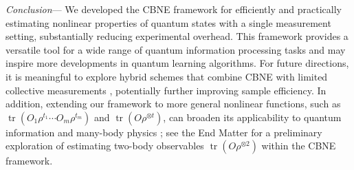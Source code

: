 \documentclass[aps,prl,twocolumn,nofootinbib,superscriptaddress,10pt]{revtex4-2}
\def\>{\rangle}
\DeclareMathOperator{\Tr}{tr}
\theoremstyle{plain}
\theoremstyle{definition}
\begin{document}
\emph{Conclusion}---
We developed the CBNE framework for efficiently and practically estimating nonlinear properties of quantum states with a single measurement setting, substantially reducing experimental overhead. 
This framework provides a versatile tool for a wide range of quantum information processing tasks and may inspire more  developments in quantum learning algorithms. 
For future directions, it is meaningful to explore hybrid schemes that combine CBNE with limited collective measurements \cite{PRXQuantum.6.010336,chen2024optimal}, potentially further improving sample efficiency. 
In addition, extending our framework to more general nonlinear functions, such as $\Tr(O_1\rho^{t_1}\cdots O_m\rho^{t_m})$ and $\Tr(O\rho^{\otimes t})$, can broaden its applicability to quantum information and many-body physics \cite{PRXQuantum.5.030338,PhysRevLett.127.260501,zhou2024hybrid}; see the End Matter for a preliminary exploration of estimating two-body observables $\Tr(O\rho^{\otimes 2})$ within the CBNE framework. 
\fi





\end{document}
